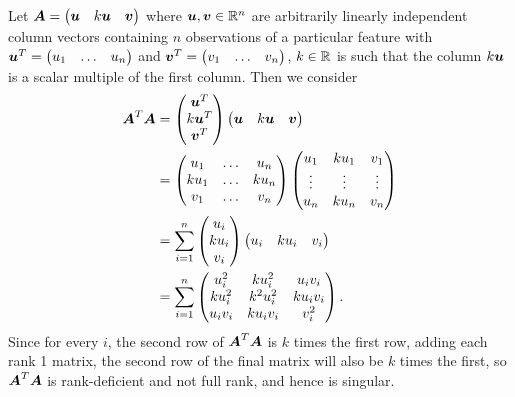 \documentclass{report}
\begin{document}
	Let $\boldsymbol{A}=\begin{pmatrix}
		\boldsymbol{u} & k\boldsymbol{u} & \boldsymbol{v}
	\end{pmatrix}$ where $\bmu,\bmv\in\Rn$ are arbitrarily linearly independent column vectors containing $n$ observations of a particular feature with $\boldsymbol{u}^T=\begin{pmatrix}
	u_1 & \ldots & u_n
	\end{pmatrix}$ and $\boldsymbol{v}^T=\begin{pmatrix}
	v_1 & \ldots & v_n
	\end{pmatrix}$, $k\in\RR$ is such that the column $k\boldsymbol{u}$ is a scalar multiple of the first column. Then we consider
	\begin{align*}
		\boldsymbol{A}^T\boldsymbol{A}&=\begin{pmatrix}
			\boldsymbol{u}^T \\ k\boldsymbol{u}^T \\ \boldsymbol{v}^T
		\end{pmatrix}\begin{pmatrix}
		\boldsymbol{u} & k\boldsymbol{u} & \boldsymbol{v}
		\end{pmatrix}\\
		&=\begin{pmatrix}
			u_1 & \ldots & u_n \\ ku_1 & \ldots & ku_n \\ v_1 & \ldots & v_n
		\end{pmatrix}\begin{pmatrix}
		u_1 & ku_1 & v_1 \\ \vdots & \vdots & \vdots \\ u_n & ku_n & v_n
		\end{pmatrix}\\
		&=\sum_{i=1}^{n}\begin{pmatrix}
			u_i \\ ku_i \\ v_i
		\end{pmatrix}\begin{pmatrix}
		u_i & ku_i & v_i
		\end{pmatrix}\\
		&=\sum_{i=1}^{n}\begin{pmatrix}
			u_i^2 & ku_i^2 & u_iv_i \\ 
			ku_i^2 & k^2u_i^2 & ku_iv_i \\
			u_iv_i & ku_iv_i & v_i^2
		\end{pmatrix}.
	\end{align*}
	Since for every $i$, the second row of $\boldsymbol{A}^T\boldsymbol{A}$ is $k$ times the first row, adding each rank 1 matrix, the second row of the final matrix will also be $k$ times the first, so $\boldsymbol{A}^T\boldsymbol{A}$ is rank-deficient and not full rank, and hence is singular. \\
	
\end{document}
